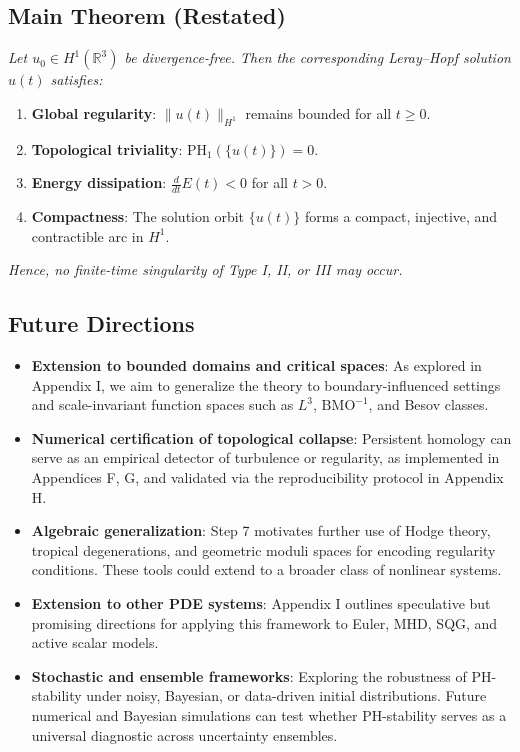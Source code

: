 \documentclass[11pt]{article}
\theoremstyle{definition}
\begin{document}
\subsection*{Main Theorem (Restated)}

\textit{Let $u_0 \in H^1(\mathbb{R}^3)$ be divergence-free. Then the corresponding Leray--Hopf solution $u(t)$ satisfies:}
\begin{enumerate}
    \item \textbf{Global regularity}: $\|u(t)\|_{H^1}$ remains bounded for all $t \geq 0$.
    \item \textbf{Topological triviality}: $\mathrm{PH}_1(\{u(t)\}) = 0$.
    \item \textbf{Energy dissipation}: $\frac{d}{dt} E(t) < 0$ for all $t > 0$.
    \item \textbf{Compactness}: The solution orbit $\{u(t)\}$ forms a compact, injective, and contractible arc in $H^1$.
\end{enumerate}
\textit{Hence, no finite-time singularity of Type I, II, or III may occur.}

\subsection*{Future Directions}

\begin{itemize}
    \item \textbf{Extension to bounded domains and critical spaces}: As explored in Appendix I, we aim to generalize the theory to boundary-influenced settings and scale-invariant function spaces such as $L^3$, $\mathrm{BMO}^{-1}$, and Besov classes.
    \item \textbf{Numerical certification of topological collapse}: Persistent homology can serve as an empirical detector of turbulence or regularity, as implemented in Appendices F, G, and validated via the reproducibility protocol in Appendix H.
    \item \textbf{Algebraic generalization}: Step 7 motivates further use of Hodge theory, tropical degenerations, and geometric moduli spaces for encoding regularity conditions. These tools could extend to a broader class of nonlinear systems.
    \item \textbf{Extension to other PDE systems}: Appendix I outlines speculative but promising directions for applying this framework to Euler, MHD, SQG, and active scalar models.
    \item \textbf{Stochastic and ensemble frameworks}: Exploring the robustness of PH-stability under noisy, Bayesian, or data-driven initial distributions. Future numerical and Bayesian simulations can test whether PH-stability serves as a universal diagnostic across uncertainty ensembles.
\end{itemize}
\end{document}

